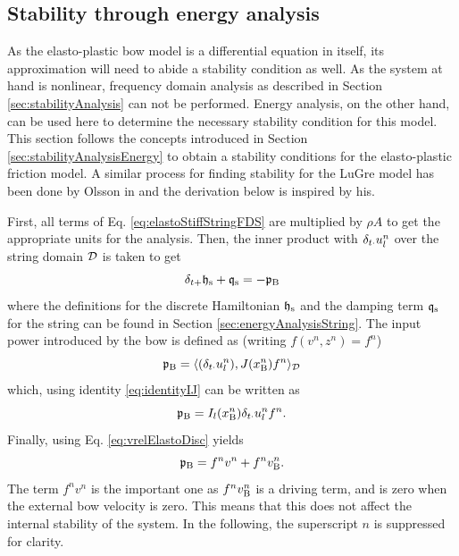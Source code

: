 \subsection{Stability through energy analysis}
As the elasto-plastic bow model is a differential equation in itself, its approximation will need to abide a stability condition as well.
As the system at hand is nonlinear, frequency domain analysis as described in Section \ref{sec:stabilityAnalysis} can not be performed. Energy analysis, on the other hand, can be used here to determine the necessary stability condition for this model. This section follows the concepts introduced in Section \ref{sec:stabilityAnalysisEnergy} to obtain a stability conditions for the elasto-plastic friction model. A similar process for finding stability for the LuGre model has been done by Olsson in \cite[p. 55]{Olsson1996} and the derivation below is inspired by his. 

First, all terms of Eq. \eqref{eq:elastoStiffStringFDS} are multiplied by $\rho A$ to get the appropriate units for the analysis. Then, the inner product with $\delta_{t\cdot} u_l^n$ over the string domain $\mathcal{D}$ is taken to get
\begin{equation}
    \delta_{t+} \mathfrak{h}_\text{s} + \mathfrak{q}_\text{s} = -\mathfrak{p}_{\text{B}}
\end{equation}
where the definitions for the discrete Hamiltonian $\mathfrak{h}_\text{s}$ and the damping term $\mathfrak{q}_\text{s}$ for the string can be found in Section \ref{sec:energyAnalysisString}. The input power introduced by the bow is defined as (writing $f(v^n,z^n) = f^n$)
\begin{equation*}
    \mathfrak{p}_{\text{B}} = \langle (\delta_{t\cdot} u_l^n), J(x_{\text{B}}^n)f^n\rangle_{\mathcal{D}}
\end{equation*}
which, using identity \eqref{eq:identityIJ} can be written as 
\begin{equation*}
    \mathfrak{p}_{\text{B}} = I_l(x_\text{B}^n)\delta_{t\cdot} u_l^n f^n.
\end{equation*}
Finally, using Eq. \eqref{eq:vrelElastoDisc} yields
\begin{equation}
    \mathfrak{p}_{\text{B}} = f^nv^n + f^n v_{\text{B}}^n.
\end{equation}
The term $f^nv^n$ is the important one as $f^nv_{\text{B}}^n$ is a driving term, and is zero when the external bow velocity is zero. This means that this does not affect the internal stability of the system. In the following, the superscript $n$ is suppressed for clarity.

